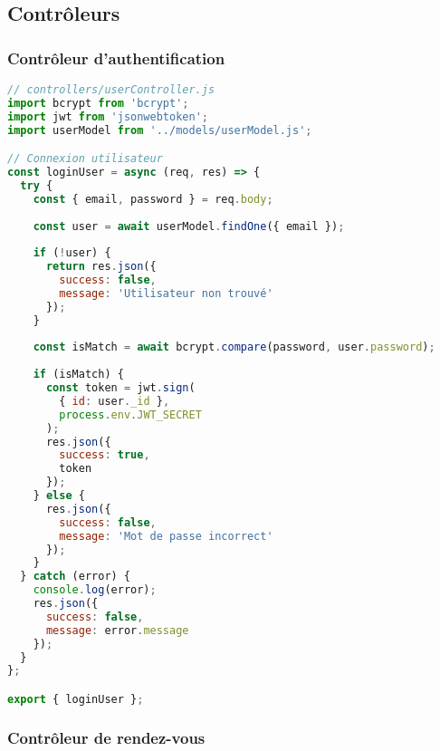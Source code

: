 \subsection{Contrôleurs}

\subsubsection{Contrôleur d'authentification}

\begin{lstlisting}[language=JavaScript, caption=Authentification utilisateur]
// controllers/userController.js
import bcrypt from 'bcrypt';
import jwt from 'jsonwebtoken';
import userModel from '../models/userModel.js';

// Connexion utilisateur
const loginUser = async (req, res) => {
  try {
    const { email, password } = req.body;
    
    const user = await userModel.findOne({ email });
    
    if (!user) {
      return res.json({
        success: false, 
        message: 'Utilisateur non trouvé'
      });
    }
    
    const isMatch = await bcrypt.compare(password, user.password);
    
    if (isMatch) {
      const token = jwt.sign(
        { id: user._id }, 
        process.env.JWT_SECRET
      );
      res.json({
        success: true, 
        token
      });
    } else {
      res.json({
        success: false, 
        message: 'Mot de passe incorrect'
      });
    }
  } catch (error) {
    console.log(error);
    res.json({
      success: false, 
      message: error.message
    });
  }
};

export { loginUser };
\end{lstlisting}

\subsubsection{Contrôleur de rendez-vous}

